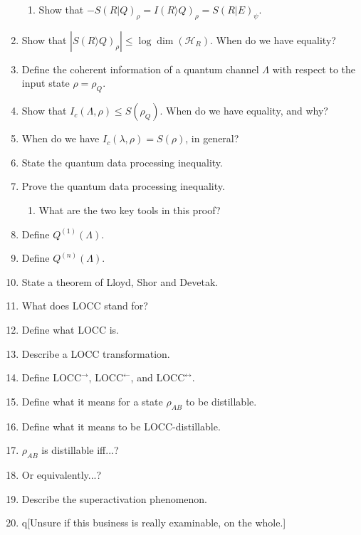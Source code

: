 \documentclass{article}
\renewcommand{\rm}[1]{\mathrm{#1}}
\newcommand{\mc}[1]{\mathcal{#1}}
\newcommand{\ra}{\rightarrow}
\begin{document}
\begin{enumerate}
\begin{enumerate}
        \item Show that $-S(R|Q)_\rho = I(R\rangle Q)_\rho = S(R|E)_\psi$.
    \end{enumerate}
    \item Show that $|S(R\rangle Q)_\rho|\le \log\dim(\mc{H}_R)$. When do we have equality?
    \item Define the coherent information of a quantum channel $\Lambda$ with respect to the input state $\rho = \rho_Q$.
    \item Show that $I_c(\Lambda,\rho)\le S(\rho_Q)$. When do we have equality, and why?
    \item When do we have $I_c(\lambda,\rho) = S(\rho)$, in general?
    \item State the quantum data processing inequality.
    \item Prove the quantum data processing inequality.
    \begin{enumerate}
        \item What are the two key tools in this proof?
    \end{enumerate}
    \item Define $Q^{(1)}(\Lambda)$.
    \item Define $Q^{(n)}(\Lambda)$.
    \item State a theorem of Lloyd, Shor and Devetak.
    \item What does LOCC stand for?
    \item Define what LOCC is.
    \item Describe a LOCC transformation.
    \item Define $\rm{LOCC}^{\ra}$, $\rm{LOCC}^{\leftarrow}$, and $\rm{LOCC}^\leftrightarrow$.
    \item Define what it means for a state $\rho_{AB}$ to be distillable.
    \item Define what it means to be LOCC-distillable.
    \item $\rho_{AB}$ is distillable iff...?
    \item Or equivalently...?
    \item Describe the superactivation phenomenon.
    \item  q[Unsure if this business is really examinable, on the whole.]
\end{enumerate}
\end{document}
